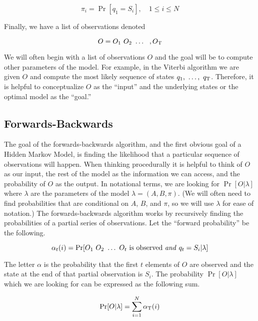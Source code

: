 \begin{equation}
  \pi_i = \Pr[q_1 = S_i], \quad 1 \leq i \leq N
\end{equation}

Finally, we have a list of observations denoted

\begin{equation}
  O = O_1\ O_2\ \ldots\ \ ,O_\Tau
\end{equation}

We will often begin with a list of observations $O$ and the goal will be
to compute other parameters of the model. For example, in the Viterbi
algorithm we are given $O$ and compute the most likely sequence of
states $q_1,\ \ldots,\ q_{\mathrm{T}}$. Therefore, it is helpful to
conceptualize $O$ as the ``input'' and the underlying states or the
optimal model as the ``goal.''

\subsection{Forwards-Backwards}

The goal of the forwards-backwards algorithm, and the first obvious goal
of a Hidden Markov Model, is finding the likelihood that a particular sequence of
observations will happen. When thinking procedurally it is helpful to think of $O$ as our input,
the rest of the model as the information we can access, and the
probability of $O$ as the output. In notational terms, we are looking for $\Pr[O
\vert \lambda]$ where $\lambda$ are the parameters of the model $\lambda
= (A, B, \pi)$. (We will often need to find probabilities that are
conditional on $A$, $B$, and $\pi$, so we will use $\lambda$ for ease of
notation.) The forwards-backwards algorithm works by recursively finding
the probabilities of a partial series of observations. Let the ``forward
probability'' be the following.

\begin{equation}
\alpha_t(i) = \Pr[O_1\ O_2\ \ldots\ O_t\ \textrm{is observed \emph{and}}\ q_t = S_i \vert \lambda]
\end{equation}

The letter $\alpha$ is the probability that the first $t$ elements
of $O$ are observed and the state at the end of that partial observation
is $S_i$. The probability $\Pr[O \vert \lambda]$ which we are
looking for can be expressed as the following sum.

\begin{equation}
  \Pr[O \vert \lambda] = \sum_{i=1}^N \alpha_{\mathrm{T}}(i)
\end{equation}

